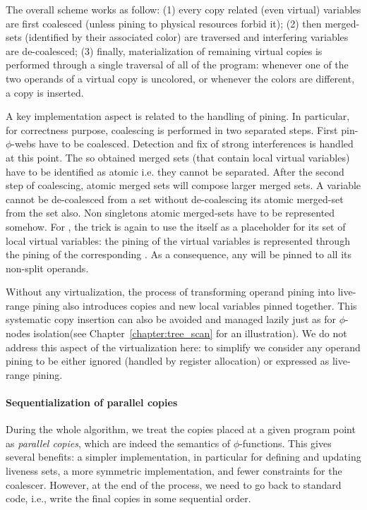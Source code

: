         
The overall scheme works as follow: (1) every copy related (even virtual) variables are first coalesced (unless pining to physical resources forbid it); (2) then merged-sets (identified by their associated color) are traversed and interfering variables are de-coalesced; (3) finally, materialization of remaining virtual copies is performed through a single traversal of all \phifuns of the program: whenever one of the two operands of a virtual copy is uncolored, or whenever the colors are different, a copy is inserted. 

A key implementation aspect is related to the handling of pining. In particular, for correctness purpose, coalescing is performed in two separated steps. First pin-$\phi$-webs have to be coalesced. Detection and fix of strong interferences is handled at this point. The so obtained merged sets (that contain local virtual variables) have to be identified as atomic i.e. they cannot be separated. After the second step of coalescing, atomic merged sets will compose larger merged sets. A variable cannot be de-coalesced from a set without de-coalescing its atomic merged-set from the set also. Non singletons atomic merged-sets have to be represented somehow. For \phifuns, the trick is again to use the \phifun itself as a placeholder for its set of local virtual variables: the pining of the virtual variables is represented through the pining of the corresponding \phifun. As a consequence, any \phifun will be pinned to all its non-split operands. 

Without any virtualization, the process of transforming operand pining into live-range pining also introduces copies and new local variables pinned together. This systematic copy insertion can also be avoided and managed lazily just as for $\phi$-nodes isolation\ifhab (see Chapter~\ref{chapter:tree_scan} for an illustration)\fi. We do not address this aspect of the virtualization here: to simplify we consider any operand pining to be either ignored (handled by register allocation) or expressed as live-range pining.





\paragraph{Sequentialization of parallel copies}

                    
During the whole algorithm, we treat the copies placed at a given program point
as \emph{parallel copies}, which are indeed the semantics of $\phi$-functions.
This gives several benefits: a simpler implementation, in particular for
defining and updating liveness sets, a more symmetric implementation,
and fewer constraints for the coalescer. However, at the end of the process, we
need to go back to standard code, i.e., write the final copies in some
sequential order.

